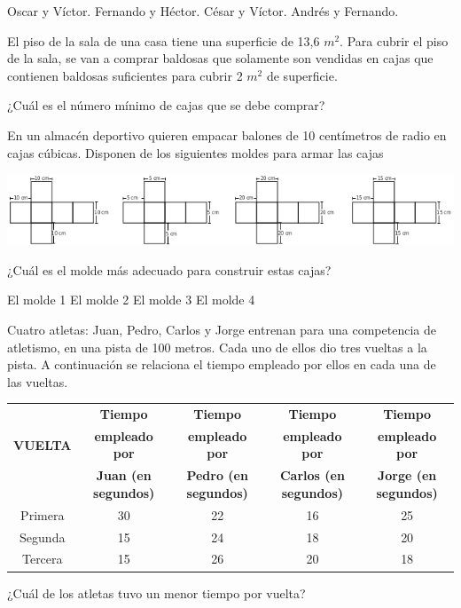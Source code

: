 \documentclass[10pt,letterpaper,addpoints]{exam}
\begin{document}
\begin{questions}
\begin{oneparchoices}
\choice Oscar y Víctor.
\choice Fernando y Héctor.
\CorrectChoice César y Víctor.
\choice Andrés y Fernando.
\end{oneparchoices}
\question El piso de la sala de una casa tiene una superficie de 13,6 $m^{2}$. Para cubrir el piso de la sala, se van a comprar baldosas que solamente son vendidas en cajas que contienen baldosas suficientes para cubrir 2 $m^2$ de superficie.

¿Cuál es el número mínimo de cajas que se debe comprar?

\begin{oneparchoices}
\end{oneparchoices}
\question En un almacén deportivo quieren empacar balones de 10 centímetros de radio en cajas cúbicas. Disponen de los siguientes moldes para armar las cajas
\begin{center}
\includegraphics[scale=.75]{Images/moldes.png} 
\end{center}
¿Cuál es el molde más adecuado para construir estas cajas?

\begin{oneparchoices}
\choice El molde 1
\choice El molde 2
\CorrectChoice El molde 3
\choice El molde 4
\end{oneparchoices}
\question Cuatro atletas: Juan, Pedro, Carlos y Jorge entrenan para una competencia de atletismo, en una pista de 100 metros. Cada uno de ellos dio tres vueltas a la pista. A continuación
se relaciona el tiempo empleado por ellos en cada una de las vueltas.
\begin{center}
\begin{tabular}{|c|c|c|c|c|}
\hline 
 & \textbf{Tiempo} & \textbf{Tiempo} & \textbf{Tiempo} & \textbf{Tiempo} \\ 
\textbf{VUELTA} & \textbf{empleado por} & \textbf{empleado por} & \textbf{empleado por} & \textbf{empleado por} \\ 
 & \textbf{Juan (en segundos)} & \textbf{Pedro (en segundos)} & \textbf{Carlos (en segundos)} & \textbf{Jorge (en segundos)} \\ 
\hline 
Primera & 30 & 22 & 16 & 25 \\ 
\hline 
Segunda & 15 & 24 & 18 & 20 \\ 
\hline 
Tercera & 15 & 26 & 20 & 18 \\ 
\hline 
\end{tabular} 
\end{center}
¿Cuál de los atletas tuvo un menor tiempo por vuelta?
 

\end{questions}
\end{document}
